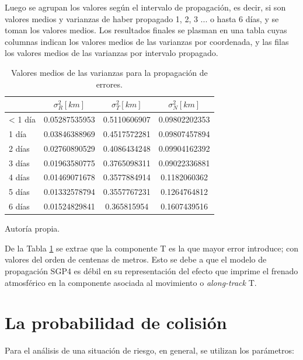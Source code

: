 Luego se agrupan los valores seg\'un el intervalo de propagaci\'on, es decir, si son valores medios y varianzas de haber propagado 1, 2, 3 ... o hasta 6 d\'ias, y se toman los valores medios. Los resultados finales se plasman en una tabla cuyas columnas indican los valores medios de las varianzas por coordenada, y las filas los valores medios de las varianzas por intervalo propagado.\\

\begin{table}[!h]
\caption[Tabla con los valores medios para la propagaci\'on de errores.]{Valores medios de las varianzas para la propagaci\'on de errores. }
\begin{tabular}{l c c c}
\hline \hline
\rowcolor{yellow!35}
&$\sigma^{2}_R [km]$ &$\sigma^{2}_T [km]$ &$\sigma^{2}_N [km]$\\
\hline \hline
< 1 d\'ia & 0.05287535953&0.5110606907&0.09802202353\\

1 d\'ia & 0.03846388969&0.4517572281&0.09807457894\\

2 d\'ias & 0.02760890529&0.4086434248&0.09904162392\\

3 d\'ias & 0.01963580775&0.3765098311&0.09022336881\\

4 d\'ias & 0.01469071678&0.3577884914&0.1182060362\\

5 d\'ias & 0.01332578794&0.3557767231&0.1264764812\\

6 d\'ias & 0.01524829841&0.365815954&0.1607439516\\
\hline
\end{tabular}
\label{tab:resultatabla0}
\begin{flushleft}
\small Autor\'ia propia.
\end{flushleft}
\end{table}

De la Tabla \ref{tab:resultatabla0} se extrae que la componente T es la que mayor error introduce; con valores del orden de centenas de metros. Esto se debe a que el modelo de propagaci\'on SGP4 es d\'ebil en su representaci\'on del efecto que imprime el frenado atmosf\'erico en la componente asociada al movimiento o {\it{along-track}} T. 

\section{La probabilidad de colisi\'on}\label{sec:probcol}
Para el an\'alisis de una situaci\'on de riesgo, en general, se utilizan los par\'ametros:\\


